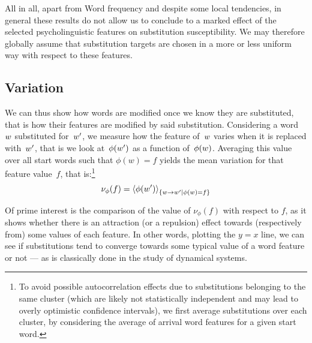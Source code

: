 All in all, apart from Word frequency and despite some local tendencies, {in general} these results do not allow us to conclude to a marked effect %
of the selected psycholinguistic features on substitution susceptibility.
We may therefore globally assume that substitution targets are chosen in a more or less uniform way with respect to these features.


\subsection{Variation}

We can thus show how words are modified once we know they are substituted, that is how their features are modified by said substitution.
Considering a word~$w$ substituted for~$w'$, we measure how the feature of~$w$ varies when it is replaced with~$w'$, that is we look at~$\phi(w')$ as a function of~$\phi(w)$.
Averaging this value over all start words such that $\phi(w) = f$ yields the mean variation for that feature value~$f$, that is:\footnote{To avoid possible autocorrelation effects due to substitutions belonging to the same cluster (which are likely not statistically independent and may lead to overly optimistic confidence intervals), we first average substitutions over each cluster, by considering the average of arrival word features for a given start word.}
$$\nu_{\phi}(f) = \left<\phi(w')\right>_{\left\lbrace w\rightarrow w' | \phi(w) = f \right\rbrace}$$

Of prime interest is the comparison of the value of $\nu_{\phi}(f)$ with respect to $f$, as it shows whether there is an attraction (or a repulsion) effect towards (respectively from) some values of each feature.
In other words, plotting the $y=x$ line, we can see if substitutions tend to converge towards some typical value of a word feature or not --- as is classically done in the study of dynamical systems.

